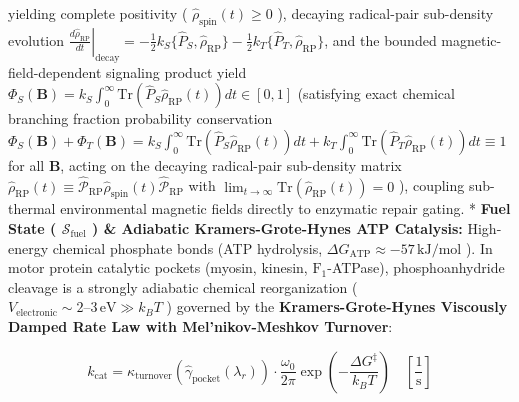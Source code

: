 \documentclass[11pt,a4paper]{article}
\theoremstyle{definition}
\theoremstyle{remark}
\begin{document}
yielding complete positivity ( $\hat{\rho}_{\text{spin}}(t) \ge 0$ ), decaying radical-pair sub-density evolution $\left.\frac{d\hat{\rho}_{\text{RP}}}{dt}\right|_{\text{decay}} = -\frac{1}{2} k_S \{ \hat{P}_S, \hat{\rho}_{\text{RP}} \} - \frac{1}{2} k_T \{ \hat{P}_T, \hat{\rho}_{\text{RP}} \}$, and the bounded magnetic-field-dependent signaling product yield $\Phi_S(\mathbf{B}) = k_S \int_0^\infty \mathrm{Tr}(\hat{P}_S \hat{\rho}_{\text{RP}}(t)) dt \in [0, 1]$ (satisfying exact chemical branching fraction probability conservation $\Phi_S(\mathbf{B}) + \Phi_T(\mathbf{B}) = k_S \int_0^\infty \mathrm{Tr}(\hat{P}_S \hat{\rho}_{\text{RP}}(t)) dt + k_T \int_0^\infty \mathrm{Tr}(\hat{P}_T \hat{\rho}_{\text{RP}}(t)) dt \equiv 1$ for all $\mathbf{B}$, acting on the decaying radical-pair sub-density matrix $\hat{\rho}_{\text{RP}}(t) \equiv \hat{\mathcal{P}}_{\text{RP}}\hat{\rho}_{\text{spin}}(t)\hat{\mathcal{P}}_{\text{RP}}$ with $\lim_{t\to\infty}\mathrm{Tr}(\hat{\rho}_{\text{RP}}(t)) = 0$ ), coupling sub-thermal environmental magnetic fields directly to enzymatic repair gating.
* \textbf{Fuel State ( $\mathcal{S}_{\text{fuel}}$ ) \& Adiabatic Kramers-Grote-Hynes ATP Catalysis:}
High-energy chemical phosphate bonds (ATP hydrolysis, $\Delta G_{\text{ATP}} \approx -57 \, \text{kJ/mol}$ ). In motor protein catalytic pockets (myosin, kinesin, $\mathrm{F}_1$-ATPase), phosphoanhydride cleavage is a strongly adiabatic chemical reorganization ( $V_{\text{electronic}} \sim 2\text{--}3 \, \mathrm{eV} \gg k_B T$ ) governed by the \textbf{Kramers-Grote-Hynes Viscously Damped Rate Law with Mel'nikov-Meshkov Turnover}:


\begin{equation}
\boxed{k_{\text{cat}} = \kappa_{\text{turnover}}\left(\hat{\gamma}_{\text{pocket}}(\lambda_r)\right) \cdot \frac{\omega_0}{2\pi} \exp\left( -\frac{\Delta G^\ddagger}{k_B T} \right) \quad [\frac{1}{\mathrm{s}}]}
\end{equation}
\end{document}
